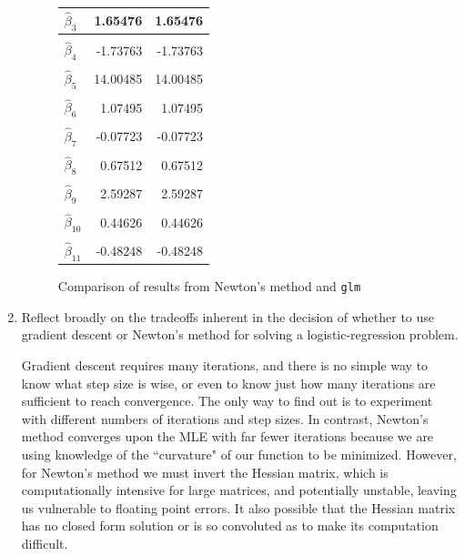 \documentclass{article}
\begin{document}
\begin{enumerate}[label=(\Alph*)]
{\begin{figure}[htp!]
\begin{tabular}{l|r|r}
		\\[-1em]
		$\hat{\beta}_3$      & 1.65476          & 1.65476         \\ \hline
		\\[-1em]
		$\hat{\beta}_4$      & -1.73763           & -1.73763        \\ \hline
		\\[-1em]
		$\hat{\beta}_5$      & 14.00485        & 14.00485        \\ \hline
		\\[-1em]
		$\hat{\beta}_6$      & 1.07495             & 1.07495         \\ \hline
		\\[-1em]
		$\hat{\beta}_7$      & -0.07723          & -0.07723        \\ \hline
		\\[-1em]
		$\hat{\beta}_8$      & 0.67512            & 0.67512         \\ \hline
		\\[-1em]
		$\hat{\beta}_9$      & 2.59287         & 2.59287         \\ \hline
		\\[-1em]
		$\hat{\beta}_{10}$ & 0.44626          & 0.44626         \\ \hline
		\\[-1em]
		$\hat{\beta}_{11}$ & -0.48248           & -0.48248           
		\end{tabular}
		\caption{Comparison of results from Newton's method and \texttt{glm}}
	\end{figure}
}


\pagebreak
\item Reflect broadly on the tradeoffs inherent in the decision of whether to use gradient descent or Newton's method for solving a logistic-regression problem.

{\color{blue}
Gradient descent requires many iterations, and there is no simple way to know what step size is wise, or even to know just how many iterations are sufficient to reach convergence. The only way to find out is to experiment with different numbers of iterations and step sizes. In contrast, Newton's method converges upon the MLE with far fewer iterations because we are using knowledge of the ``curvature" of our function to be minimized. However, for Newton's method we must invert the Hessian matrix, which is computationally intensive for large matrices, and potentially unstable, leaving us vulnerable to floating point errors. It also possible that the Hessian matrix has no closed form solution or is so convoluted as to make its computation difficult.
}



\end{enumerate}
\end{document}
